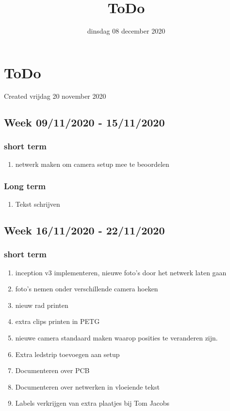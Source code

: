 \documentclass{scrartcl}
\title{ToDo}
\date{dinsdag 08 december 2020}
\author{}
\begin{document}
\maketitle

		\section{ToDo}

Created vrijdag 20 november 2020



\subsection{Week 09/11/2020 - 15/11/2020}



\subsubsection{short term}

\begin{enumerate}[1]
\item netwerk maken om camera setup mee te beoordelen
\end{enumerate}


\subsubsection{Long term}

\begin{enumerate}[1]
\item Tekst schrijven
\end{enumerate}


\subsection{Week 16/11/2020 - 22/11/2020}



\subsubsection{short term}

\begin{enumerate}[1]
\item inception v3 implementeren, nieuwe foto's door het netwerk laten gaan
\item foto's nemen onder verschillende camera hoeken
\item nieuw rad printen 
\item extra clips printen in PETG
\item nieuwe camera standaard maken waarop posities te veranderen zijn.
\item Extra ledstrip toevoegen aan setup
\item Documenteren over PCB
\item Documenteren over netwerken in vloeiende tekst
\item Labels verkrijgen van extra plaatjes bij Tom Jacobs
\end{enumerate}
\end{document}
